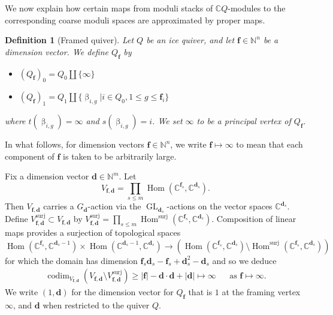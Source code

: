 \documentclass[a4paper,10pt]{amsart}
\newtheorem{definition}[theorem]{Definition}
\newcommand{\dd}{\mathbf{d}}
\newcommand{\ff}{\mathbf{f}}
\renewcommand{\beta}{\upbeta}
\DeclareMathOperator{\surj}{surj}
\DeclareMathOperator{\Hom}{Hom}
\DeclareMathOperator{\codim}{codim}
\DeclareMathOperator{\Gl}{GL}
\begin{document}
We now explain how certain maps from moduli stacks of $\mathbb{C}Q$-modules to the corresponding coarse moduli spaces are approximated by proper maps.
\begin{definition}[Framed quiver]
Let $Q$ be an ice quiver, and let $\ff\in\mathbb{N}^{n}$ be a dimension vector.  We define $Q_{\ff}$ by 
\begin{itemize}
\item
$(Q_{\ff})_0=Q_0\coprod \{\infty\}$
\item
$(Q_{\ff})_1=Q_1\coprod\{\beta_{i,g}|i\in Q_0,1\leq g\leq \ff_i\}$
\end{itemize}
where $t(\beta_{i,g})=\infty$ and $s(\beta_{i,g})=i$.  We set $\infty$ to be a principal vertex of $Q_{\ff}$.
\end{definition}
In what follows, for dimension vectors $\ff\in\mathbb{N}^n$, we write $\ff\mapsto \infty$ to mean that each component of $\ff$ is taken to be arbitrarily large.

Fix a dimension vector $\dd\in\mathbb{N}^{m}$.  Let 
\begin{equation}
\label{VDef}
V_{\ff,\dd}=\prod_{s\leq m}\Hom(\mathbb{C}^{\ff_s},\mathbb{C}^{\dd_s}).  
\end{equation}
Then $V_{\ff,\dd}$ carries a $G_{\dd}$-action via the $\Gl_{\dd_s}$-actions on the vector spaces $\mathbb{C}^{\dd_s}$.  Define $V_{\ff,\dd}^{\surj}\subset V_{\ff,\dd}$ by $V_{\ff,\dd}^{\surj}=\prod_{s\leq m}\Hom^{\surj}(\mathbb{C}^{\ff_s},\mathbb{C}^{\dd_s})$.  Composition of linear maps provides a surjection of topological spaces
\[
\Hom(\mathbb{C}^{\ff_s},\mathbb{C}^{\dd_s-1})\times \Hom(\mathbb{C}^{\dd_s-1},\mathbb{C}^{\dd_s})\rightarrow  \left(\Hom(\mathbb{C}^{\ff_s},\mathbb{C}^{\dd_s})\setminus \Hom^{\surj}(\mathbb{C}^{\ff_s},\mathbb{C}^{\dd_s})\right)
\]
for which the domain has dimension $\ff_s\dd_s-\ff_s+\dd_s^2-\dd_s$ and so we deduce
\begin{align}
\label{codim}
\codim_{V_{\ff,\dd}}\left(V_{\ff,\dd}\setminus V^{\surj}_{\ff,\dd}\right)\geq \lvert\ff\rvert-\dd\cdot\dd+\lvert\dd\rvert\mapsto \infty&&\textrm{as }\ff\mapsto\infty.
\end{align}
We write $(1,\dd)$ for the dimension vector for $Q_\ff$ that is $1$ at the framing vertex $\infty$, and $\dd$ when restricted to the quiver $Q$.
\end{document}
